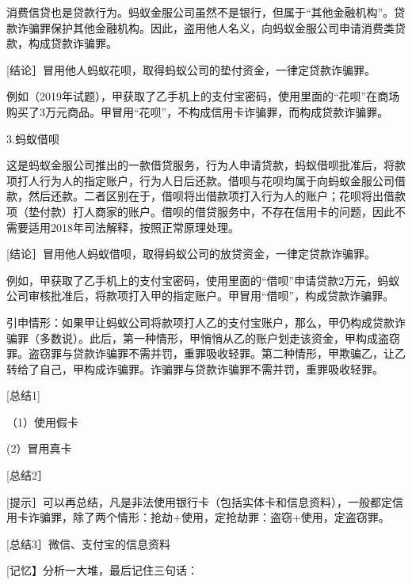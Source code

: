 消费信贷也是贷款行为。蚂蚁金服公司虽然不是银行，但属于“其他金融机构”。贷款诈骗罪保护其他金融机构。因此，盗用他人名义，向蚂蚁金服公司申请消费类贷款，构成贷款诈骗罪。

[结论］冒用他人蚂蚁花呗，取得蚂蚁公司的垫付资金，一律定贷款诈骗罪。

例如（2019年试题），甲获取了乙手机上的支付宝密码，使用里面的“花呗”在商场购买了3万元商品。甲冒用“花呗”，不构成信用卡诈骗罪，而构成贷款诈骗罪。

3.蚂蚁借呗

这是蚂蚁金服公司推出的一款借贷服务，行为人申请贷款，蚂蚁借呗批准后，将款项打人行为人的指定账户，行为人日后还款。借呗与花呗均属于向蚂蚁金服公司借款，然后还款。二者区别在于，借呗将出借款项打入行为人的账户；花呗将出借款项（垫付款）打人商家的账户。借呗的借贷服务中，不存在信用卡的问题，因此不需要适用2018年司法解释，按照正常原理处理。

[结论］冒用他人蚂蚁借呗，取得蚂蚁公司的放贷资金，一律定贷款诈骗罪。

例如，甲获取了乙手机上的支付宝密码，使用里面的“借呗”申请贷款2万元，蚂蚁公司审核批准后，将款项打入甲的指定账户。甲冒用“借呗”，构成贷款诈骗罪。

引申情形：如果甲让蚂蚁公司将款项打人乙的支付宝账户，那么，甲仍构成贷款诈骗罪（多数说）。此后，第一种情形，甲悄悄从乙的账户划走该资金，甲构成盗窃罪。盗窃罪与贷款诈骗罪不需并罚，重罪吸收轻罪。第二种情形，甲欺骗乙，让乙转给了自己，甲构成诈骗罪。诈骗罪与贷款诈骗罪不需并罚，重罪吸收轻罪。

[总结1]

（1）使用假卡


(2）冒用真卡


[总结2］


[提示］可以再总结，凡是非法使用银行卡（包括实体卡和信息资料），一般都定信用卡诈骗罪，除了两个情形：抢劫+使用，定抢劫罪：盗窃+使用，定盗窃罪。

[总结3］微信、支付宝的信息资料


[记忆】分析一大堆，最后记住三句话：


